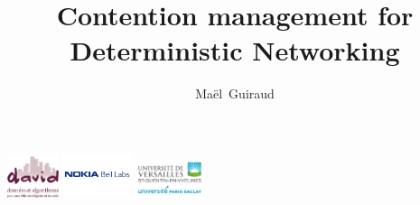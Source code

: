\documentclass[10 pt]{beamer}
\title{Contention management for Deterministic Networking}
\author{Maël~Guiraud}
\institute[Nokia Bell Labs, DAVID-UVSQ] 
{
  DAVID, Universit\'e de Versailles Saint Quentin -
  Nokia Bell Labs France \\
}
\begin{document}
\begin{frame}

  \titlepage
  \centering
  \includegraphics [width=15mm]{logod.png} \hspace{1cm} \includegraphics [width=20mm]{logon.png} \hspace{1cm} \includegraphics [width=20mm]{logo.png} \\
\end{frame}

\begin{frame}

  \tableofcontents[]
\end{frame}
\end{document}
